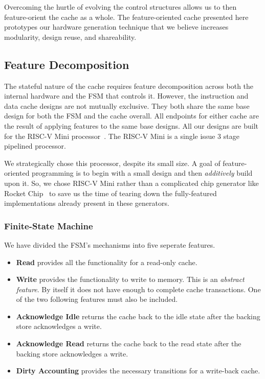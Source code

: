 \documentclass[conference]{IEEEtran}
\begin{document}
Overcoming the hurtle of evolving the control structures allows us to then feature-orient the cache as a whole. The feature-oriented cache presented here prototypes our hardware generation technique that we believe increases modularity, design reuse, and shareability.

\subsection{Feature Decomposition}
The stateful nature of the cache requires feature decomposition across both the internal hardware and the FSM that controls it. However, the instruction and data cache designs are not mutually exclusive. They both share the same base design for both the FSM and the cache overall. All endpoints for either cache are the result of applying features to the same base designs. All our designs are built for the RISC-V Mini processor~\cite{RvMini}. The RISC-V Mini is a single issue 3 stage pipelined processor. 

We strategically chose this processor, despite its small size. A goal of feature-oriented programming is to begin with a small design and then \emph{additively} build upon it. So, we chose RISC-V Mini rather than a complicated chip generator like Rocket Chip~\cite{chisel:riscv} to save us the time of tearing down the fully-featured implementations already present in these generators.

\subsubsection{Finite-State Machine}
We have divided the FSM's mechanisms into five seperate features.
\begin{itemize}
    \item \textbf{Read} provides all the functionality for a read-only cache. 
    \item \textbf{Write} provides the functionality to write to memory. This is an \emph{abstract feature}. By itself it does not have enough to complete cache transactions. One of the two following features must also be included.
    \item \textbf{Acknowledge Idle} returns the cache back to the idle state after the backing store acknowledges a write.
    \item \textbf{Acknowledge Read} returns the cache back to the read state after the backing store acknowledges a write.
    \item \textbf{Dirty Accounting} provides the necessary transitions for a write-back cache.
\end{itemize}
\end{document}
